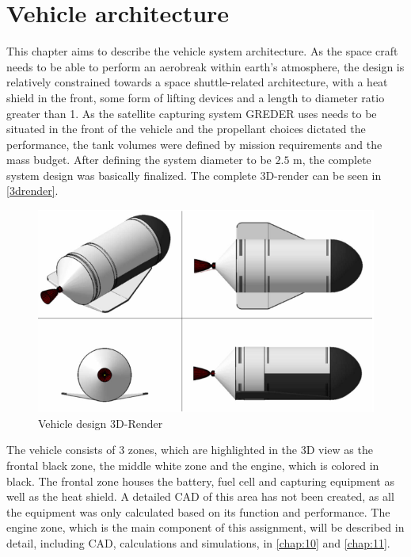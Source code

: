 \chapter{Vehicle architecture}
\qquad This chapter aims to describe the vehicle system architecture. As the space craft needs to be able to perform an aerobreak within earth’s atmosphere, the design is relatively constrained towards a space shuttle-related architecture, with a heat shield in the front, some form of lifting devices and a length to diameter ratio greater than 1. As the satellite capturing system GREDER uses needs to be situated in the front of the vehicle and the propellant choices dictated the performance, the tank volumes were defined by mission requirements and the mass budget. After defining the system diameter to be $2.5$ m, the complete system design was basically finalized. The complete 3D-render can be seen in \autoref{3drender}.

\begin{figure}[H]
	\centering\includegraphics[width=\linewidth]{3drender}
	\caption{Vehicle design 3D-Render}\label{3drender}
\end{figure}

The vehicle consists of 3 zones, which are highlighted in the 3D view as the frontal black zone, the middle white zone and the engine, which is colored in black. The frontal zone houses the battery, fuel cell and capturing equipment as well as the heat shield. A detailed CAD of this area has not been created, as all the equipment was only calculated based on its function and performance. The engine zone, which is the main component of this assignment, will be described in detail, including CAD, calculations and simulations, in \autoref{chap:10} and \autoref{chap:11}. \\

